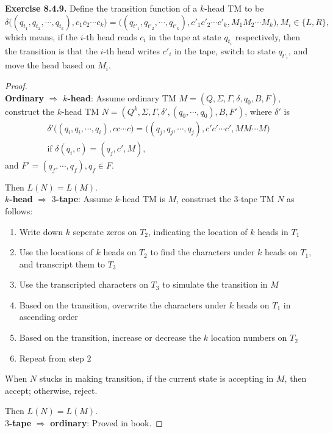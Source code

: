 \documentclass[a4paper]{article}
\newtheorem*{proof}{Proof}
\newenvironment{exercise}[1]{
	\par
	\noindent\textbf{Exercise #1.}\quad
}{
	\par
	\bigskip
}
\begin{document}
\begin{exercise}{8.4.9} Define the transition function of a $k$-head TM to be
    $$
    \delta\big((q_{t_1},q_{t_2},\cdots,q_{t_k}),c_1c_2\cdots c_k\big)=
    \big((q_{t'_1},q_{t'_2},\cdots,q_{t'_k}),c'_1c'_2\cdots c'_k,M_1M_2\cdots M_k\big),M_i\in\{L,R\},
    $$
    which means,
    if the $i$-th head reads $c_i$ in the tape at state $q_{t_i}$ respectively, then the transition
    is that the $i$-th head writes $c'_i$ in the tape, switch to state $q_{t'_i}$, and move the head based on $M_i$.
    \begin{proof}\hspace{0pt}\\
    \textbf{Ordinary} $\Rightarrow$ \textbf{$k$-head}:
        Assume ordinary TM $M=(Q,\Sigma,\Gamma,\delta,q_0,B,F)$, construct the $k$-head TM
        $N=(Q^k,\Sigma,\Gamma,\delta',(q_0,\cdots,q_0),B,F')$, where $\delta'$ is
        \begin{gather*}
        \delta'\big((q_i,q_i,\cdots,q_i),cc\cdots c\big)=\big((q_j,q_j,\cdots,q_j),c'c'\cdots c',MM\cdots M\big)\\
        \text{if }\delta(q_i,c)=(q_j,c',M),
        \end{gather*}
        and $F'=(q_f,\cdots,q_f),q_f\in F$.\par
        Then $L(N)=L(M)$.\\
    \textbf{$k$-head} $\Rightarrow$ \textbf{$3$-tape}:
        Assume $k$-head TM is $M$, construct the $3$-tape TM $N$ as follows:
        \begin{enumerate}
            \item Write down $k$ seperate zeros on $T_2$, indicating the location of $k$ heads in $T_1$
            \item Use the locations of $k$ heads on $T_2$ to find the characters under $k$ heads on $T_1$, and
                transcript them to $T_3$
            \item Use the transcripted characters on $T_3$ to simulate the transition in $M$
            \item Based on the transition, overwrite the characters under $k$ heads on $T_1$ in ascending order
            \item Based on the transition, increase or decrease the $k$ location numbers on $T_2$
            \item Repeat from step $2$
        \end{enumerate}
        When $N$ stucks in making transition, if the current state is accepting in $M$, then accept;
        otherwise, reject.\par
        Then $L(N)=L(M)$.\\
    \textbf{$3$-tape} $\Rightarrow$ \textbf{ordinary}:
        Proved in book.
    \end{proof}
\end{exercise}
\end{document}

